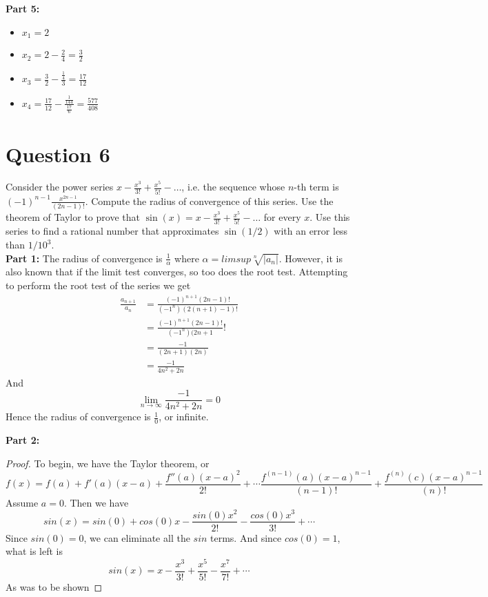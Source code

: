 \documentclass[12pt, letterpaper]{article}
\begin{document}
\textbf{Part 5:}
\begin{itemize}
  \item $x_1 = 2$
  \item $x_2 = 2 - \frac{2}{4} = \frac{3}{2}$
  \item $x_3 = \frac{3}{2} - \frac{\frac{1}{4}}{3} = \frac{17}{12}$
  \item $x_4 = \frac{17}{12} - \frac{\frac{1}{144}}{\frac{17}{6}} = \frac{577}{408}$
\end{itemize}
\section*{Question 6}
Consider the power series $x-\frac{x^3}{3!} + \frac{x^5}{5!} - \ldots$, i.e. the sequence whose $n$-th term is $(-1)^{n-1}\frac{x^{2n-1}}{(2n-1)!}$. Compute the
radius of convergence of this series. Use the theorem of Taylor to prove that $\sin(x)=x-\frac{x^3}{3!} + \frac{x^5}{5!} - \ldots$ for every $x$.
Use this series to find a rational number that approximates $\sin(1/2)$ with an error less than $1/10^3$.\\

\textbf{Part 1:}
The radius of convergence is $\frac{1}{\alpha}$ where $\alpha = limsup \sqrt[n]{|a_n|}$. However, it is also known that if the limit test converges, so too does the root test.
Attempting to perform the root test of the series we get
\begin{align*}
  \frac{a_{n+1}}{a_n} &= \frac{(-1)^{n+1}(2n - 1)!}{(-1^n)(2(n+1) - 1)!}\\[10pt]
  &= \frac{(-1)^{n+1}(2n - 1)!}{(-1^n)(2n + 1}!\\[10pt]
  &= \frac{-1}{(2n + 1)(2n)} \\[10pt]
  &= \frac{-1}{4n^2 + 2n}
\end{align*}
And
$$ \lim_{n \to \infty} \frac{-1}{4n^2 + 2n} = 0$$
Hence the radius of convergence is $\frac{1}{0}$, or infinite.
\pagebreak

\textbf{Part 2:}
\begin{proof}
  To begin, we have the Taylor theorem, or
  $$ f(x) = f(a) + f'(a)(x-a) + \frac{f''(a)(x-a)^2}{2!} + \cdots \frac{f^{(n-1)}(a)(x-a)^{n-1}}{(n-1)!} + \frac{f^{(n)}(c)(x-a)^{n-1}}{(n)!} $$
  Assume $a = 0$. Then we have
  $$ sin(x) = sin(0) + cos(0)x - \frac{sin(0)x^2}{2!} - \frac{cos(0)x^3}{3!} + \cdots$$
  Since $sin(0)= 0$, we can eliminate all the $sin$ terms. And since $cos(0) = 1$, what is left is
  $$ sin(x) = x - \frac{x^3}{3!} + \frac{x^5}{5!} - \frac{x^7}{7!} + \cdots $$
  As was to be shown
\end{proof}
\end{document}
